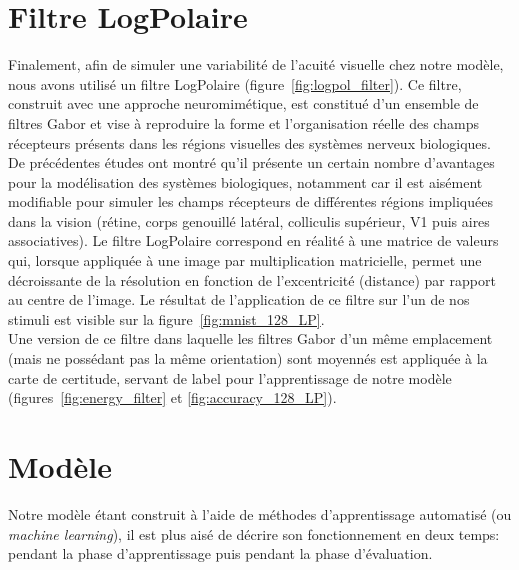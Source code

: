 \section{Filtre LogPolaire}
Finalement, afin de simuler une variabilité de l'acuité visuelle chez notre modèle, nous avons utilisé un filtre LogPolaire (figure~\ref{fig:logpol_filter}).
Ce filtre, construit avec une approche neuromimétique, est constitué d'un ensemble de filtres Gabor et vise à reproduire la forme et l'organisation réelle des champs récepteurs présents dans les régions visuelles des systèmes nerveux biologiques. 
De précédentes études ont montré qu'il présente un certain nombre d'avantages pour la modélisation des systèmes biologiques, notamment car il est aisément modifiable pour simuler les champs récepteurs de différentes régions impliquées dans la vision (rétine, corps genouillé latéral, colliculis supérieur, V1 puis aires associatives).
Le filtre LogPolaire correspond en réalité à une matrice de valeurs qui, lorsque appliquée à une image par multiplication matricielle, permet une décroissante de la résolution en fonction de l'excentricité (distance) par rapport au centre de l'image. 
Le résultat de l'application de ce filtre sur l'un de nos stimuli est visible sur la figure~\ref{fig:mnist_128_LP}. \autocite{Freeman2011} \\
Une version de ce filtre dans laquelle les filtres Gabor d'un même emplacement (mais ne possédant pas la même orientation) sont moyennés est appliquée à la carte de certitude, servant de label pour l'apprentissage de notre modèle (figures~\ref{fig:energy_filter} et \ref{fig:accuracy_128_LP}).

\section{Modèle}
Notre modèle étant construit à l'aide de méthodes d'apprentissage automatisé (ou \textit{machine learning}), il est plus aisé de décrire son fonctionnement en deux temps: pendant la phase d'apprentissage puis pendant la phase d'évaluation. \\



